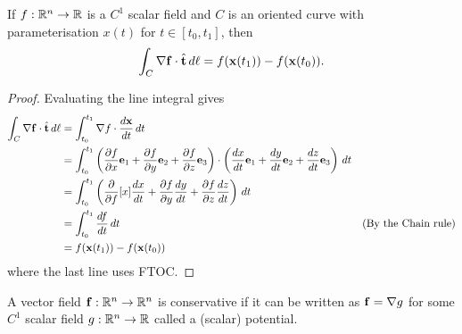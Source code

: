 \documentclass[10pt, a4paper]{article}
\begin{document}
\begin{theorem}
    If $f : \R ^ n \to \R$ is a $C ^ {1}$ scalar field and $C$ is an oriented curve with parameterisation $x(t)$ for $t \in [t_0, t_1]$,
    then
    \[
    \int_{C}\bnabla\mbf{f} \cdot \hat{\mbf{t}}\,d\ell = f(\mbf{x}(t_1)) - f(\mbf{x}(t_0)).
    \]

    \begin{proof}
        Evaluating the line integral gives
        \begin{align*}
            \int_{C}\bnabla\mbf{f} \cdot \hat{\mbf{t}}\,d\ell &= \int_{t_0}^{t_1}\bnabla f\cdot\frac{d\mbf{x}}{dt}\,dt \\
            &= \int_{t_0}^{t_1}\left(\pd[f]{x}\mbf{e}_1 + \pd[f]{y}\mbf{e}_2 + \pd[f]{z}\mbf{e}_3\right) \cdot \left(\frac{dx}{dt}\mbf{e}_1 + \frac{dy}{dt}\mbf{e}_2 + \frac{dz}{dt}\mbf{e}_3\right)\,dt \\
            &= \int_{t_0}^{t_1}\left(\pd{f}[x]\frac{dx}{dt} + \pd[f]{y}\frac{dy}{dt} + \pd[f]{z}\frac{dz}{dt}\right)\,dt \\
            &= \int_{t_0}^{t_1}\frac{df}{dt}\,dt&(\text{By the Chain rule}) \\
            &= f(\mbf{x}(t_1)) - f(\mbf{x}(t_0))
        \end{align*}
        where the last line uses FTOC.
    \end{proof}
\end{theorem}

\begin{definition}
    A vector field $\mbf{f} : \R ^ n \to \R ^ n$ is conservative if it can be written as $\mbf{f} = \bnabla g$ for some $C ^ {1}$ scalar field $g : \R ^ n \to \R$ called a
    (scalar)
    potential.
\end{definition}
\end{document}
